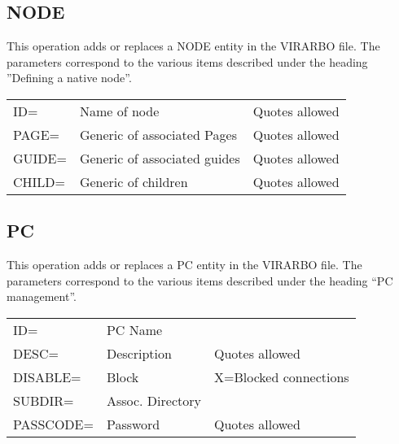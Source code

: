 \documentclass[letterpaper,10pt,english]{sphinxmanual}
\begin{document}
\subsection{NODE}
\label{\detokenize{Installation_Guide:node}}\label{\detokenize{Installation_Guide:index-165}}
This operation adds or replaces a NODE entity in the VIRARBO file. The parameters correspond to the various items described under the heading ”Defining a native node”.


\begin{savenotes}\sphinxattablestart
\centering
\begin{tabulary}{\linewidth}[t]{|T|T|T|}
\hline
{}\relax &\relax &\relax \\
\hline
ID=
&
Name of node
&
Quotes allowed
\\
\hline
PAGE=
&
Generic of associated Pages
&
Quotes allowed
\\
\hline
GUIDE=
&
Generic of associated guides
&
Quotes allowed
\\
\hline
CHILD=
&
Generic of children
&
Quotes allowed
\\
\hline
\end{tabulary}
\par
\sphinxattableend\end{savenotes}


\subsection{PC}
\label{\detokenize{Installation_Guide:pc}}\label{\detokenize{Installation_Guide:index-166}}
This operation adds or replaces a PC entity in the VIRARBO file. The parameters correspond to the various items described under the heading “PC management”.


\begin{savenotes}\sphinxattablestart
\centering
\begin{tabulary}{\linewidth}[t]{|T|T|T|}
\hline
{}\relax &\relax &\relax \\
\hline
ID=
&
PC Name
&\\
\hline
DESC=
&
Description
&
Quotes allowed
\\
\hline
DISABLE=
&
Block
&
X=Blocked connections
\\
\hline
SUBDIR=
&
Assoc. Directory
&\\
\hline
PASSCODE=
&
Password
&
Quotes allowed
\\
\hline
\end{tabulary}
\par
\sphinxattableend\end{savenotes}
\end{document}
